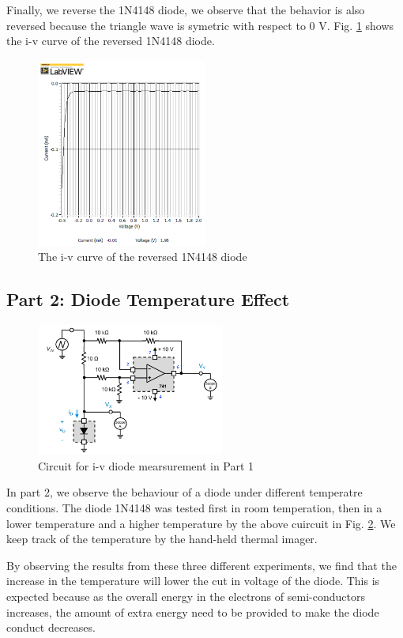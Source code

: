 \documentclass[letterpaper, 10 pt, conference]{ieeeconf}  %
\begin{document}
\par Finally, we reverse the 1N4148 diode, we observe that the behavior is also reversed because the triangle wave is symetric with respect to 0 V. Fig. \ref{fig:7} shows the i-v curve of the reversed 1N4148 diode.
	\begin{figure}[h]
        \centering
        \includegraphics[width=0.5\textwidth]{images/result6.png}
        \caption{The i-v curve of the reversed 1N4148 diode}
		\label{fig:7}
    \end{figure}
    \subsection{Part 2: Diode Temperature Effect}
	\begin{figure}[h]
        \centering
        \includegraphics[width=0.55\textwidth]{images/Part1circuit.png}
        \caption{Circuit for i-v diode mearsurement in Part 1}
		\label{fig:8}
    \end{figure}
    In part 2, we observe the behaviour of a diode under different temperatre conditions. The diode 1N4148 was tested first in room temperation, then in a lower temperature and a higher temperature by the above cuircuit in Fig. \ref{fig:8}. We keep track of the temperature by the hand-held thermal imager. 
\par By observing the results from these three different experiments, we find that the increase in the temperature will lower the cut in voltage of the diode. This is expected because as the overall energy in the electrons of semi-conductors increases, the amount of extra energy need to be provided to make the diode conduct decreases.\newline
\end{document}
